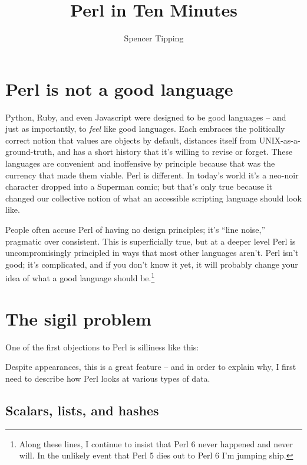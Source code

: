 \documentclass{article}
\title{Perl in Ten Minutes}
\author{Spencer Tipping}
\begin{document}
\maketitle
\tableofcontents

\section{Perl is not a good language}

Python, Ruby, and even Javascript were designed to be good languages -- and
just as importantly, to {\em feel} like good languages. Each embraces the
politically correct notion that values are objects by default, distances itself
from UNIX-as-a-ground-truth, and has a short history that it's willing to
revise or forget. These languages are convenient and inoffensive by principle
because that was the currency that made them viable. Perl is different. In
today's world it's a neo-noir character dropped into a Superman comic; but
that's only true because it changed our collective notion of what an accessible
scripting language should look like.

People often accuse Perl of having no design principles; it's ``line noise,''
pragmatic over consistent. This is superficially true, but at a deeper level
Perl is uncompromisingly principled in ways that most other languages aren't.
Perl isn't good; it's complicated, and if you don't know it yet, it will
probably change your idea of what a good language should be.\footnote{Along
these lines, I continue to insist that Perl 6 never happened and never will. In
the unlikely event that Perl 5 dies out to Perl 6 I'm jumping ship.}

\section{The sigil problem}

One of the first objections to Perl is silliness like this:


Despite appearances, this is a great feature -- and in order to explain why, I
first need to describe how Perl looks at various types of data.

\subsection{Scalars, lists, and hashes}
\end{document}
